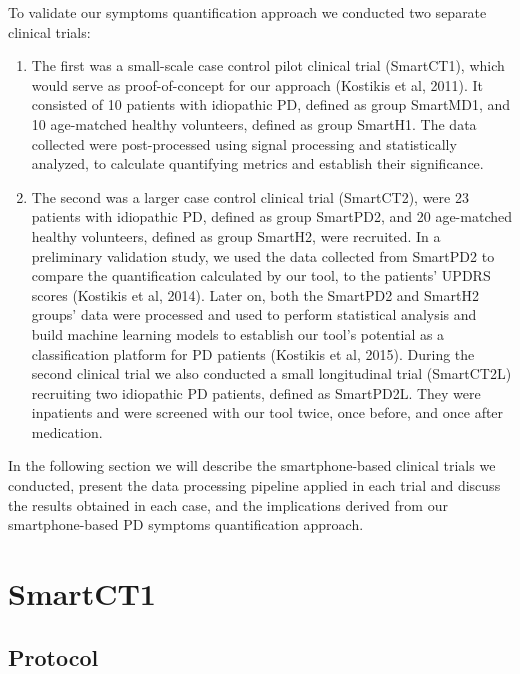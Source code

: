 To validate our symptoms quantification approach we conducted two separate clinical trials: 

\begin{enumerate}
\item The first was a small-scale case control pilot clinical trial (\gls{SmartCT1}), which would serve as proof-of-concept for our approach (Kostikis et al, 2011). It consisted of 10 patients with idiopathic \gls{PD}, defined as group \gls{SmartMD1}, and 10 age-matched healthy volunteers, defined as group \gls{SmartH1}. The data collected were post-processed using signal processing and statistically analyzed, to calculate quantifying metrics and establish their significance. 
\item The second was a larger case control clinical trial (\gls{SmartCT2}), were 23 patients with idiopathic \gls{PD}, defined as group \gls{SmartPD2}, and 20 age-matched healthy volunteers, defined as group \gls{SmartH2}, were recruited. In a preliminary validation study, we used the data collected from \gls{SmartPD2} to compare the quantification calculated by our tool, to the patients' \gls{UPDRS} scores (Kostikis et al, 2014). Later on, both the \gls{SmartPD2} and \gls{SmartH2} groups' data were processed and used to perform statistical analysis and build machine learning models to establish our tool's potential as a classification platform for \gls{PD} patients (Kostikis et al, 2015). During the second clinical trial we also conducted a small longitudinal trial (\gls{SmartCT2L}) recruiting two idiopathic \gls{PD} patients, defined as \gls{SmartPD2L}. They were inpatients and were screened with our tool twice, once before, and once after medication. 
\end{enumerate}

In the following section we will describe the smartphone-based clinical trials we conducted, present the data processing pipeline applied in each trial and discuss the results obtained in each case, and the implications derived from our smartphone-based \gls{PD} symptoms quantification approach. 

\section{SmartCT1}
\label{sec:SmartCT1}

\subsection{Protocol}
\label{subsec:SmartCT1Protocol}

